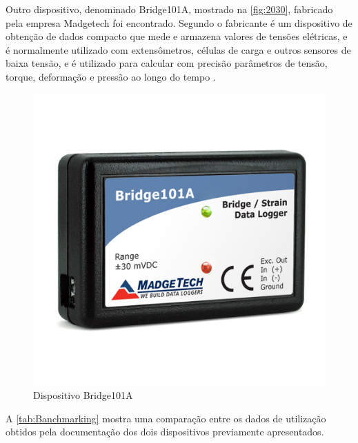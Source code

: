 Outro dispositivo, denominado Bridge101A, mostrado na \autoref{fig:2030}, fabricado pela empresa Madgetech foi encontrado.
Segundo o fabricante é um dispositivo de obtenção de dados compacto que mede e armazena valores de tensões elétricas, e é normalmente utilizado com extensômetros, células
de carga e outros sensores de baixa tensão, e é utilizado para calcular com precisão parâmetros de tensão, torque, deformação e pressão ao longo do tempo \autocite{Bridge101A}.

\begin{figure}[htb]
	\caption{\label{fig:2030} Dispositivo Bridge101A}
	\begin{center}
		\includegraphics[width=\textwidth]{pictures/2030.jpg}
	\end{center}
\end{figure}

A \autoref{tab:Banchmarking} mostra uma comparação entre os dados de utilização obtidos pela documentação dos dois dispositivos previamente apresentados.

